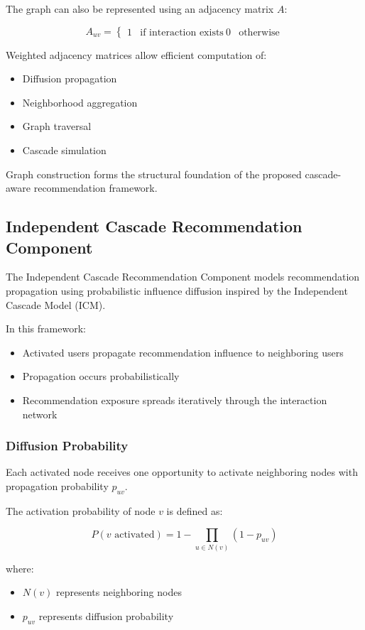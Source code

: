 \documentclass{article}
\begin{document}
The graph can also be represented using an adjacency matrix $A$:

$$
A_{uv} =
\begin{cases}
1 & \text{if interaction exists} \
0 & \text{otherwise}
\end{cases}
$$

Weighted adjacency matrices allow efficient computation of:
\begin{itemize}
\item Diffusion propagation
\item Neighborhood aggregation
\item Graph traversal
\item Cascade simulation
\end{itemize}

Graph construction forms the structural foundation of the proposed cascade-aware recommendation framework.

\subsection{Independent Cascade Recommendation Component}

The Independent Cascade Recommendation Component models recommendation propagation using probabilistic influence diffusion inspired by the Independent Cascade Model (ICM).

In this framework:
\begin{itemize}
\item Activated users propagate recommendation influence to neighboring users
\item Propagation occurs probabilistically
\item Recommendation exposure spreads iteratively through the interaction network
\end{itemize}

\subsubsection{Diffusion Probability}

Each activated node receives one opportunity to activate neighboring nodes with propagation probability \(p_{uv}\).

The activation probability of node \(v\) is defined as:

\[
P(v \text{ activated}) =
1 - \prod_{u \in N(v)} (1 - p_{uv})
\]

where:
\begin{itemize}
\item \(N(v)\) represents neighboring nodes
\item \(p_{uv}\) represents diffusion probability
\end{itemize}
\end{document}
